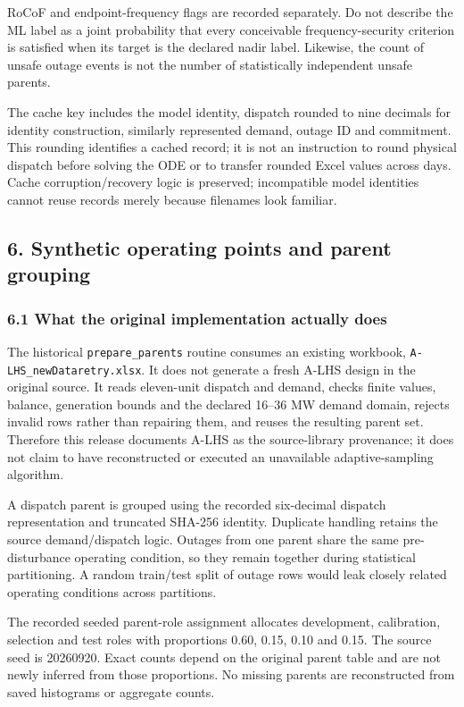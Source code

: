 \documentclass[
  11pt,
  a4paper,
]{article}
\begin{document}
RoCoF and endpoint-frequency flags are recorded separately. Do not
describe the ML label as a joint probability that every conceivable
frequency-security criterion is satisfied when its target is the
declared nadir label. Likewise, the count of unsafe outage events is not
the number of statistically independent unsafe parents.

The cache key includes the model identity, dispatch rounded to nine
decimals for identity construction, similarly represented demand, outage
ID and commitment. This rounding identifies a cached record; it is not
an instruction to round physical dispatch before solving the ODE or to
transfer rounded Excel values across days. Cache corruption/recovery
logic is preserved; incompatible model identities cannot reuse records
merely because filenames look familiar.

\subsection{6. Synthetic operating points and parent
grouping}\label{synthetic-operating-points-and-parent-grouping}

\subsubsection{6.1 What the original implementation actually
does}\label{what-the-original-implementation-actually-does}

The historical \texttt{prepare\_parents} routine consumes an existing
workbook, \texttt{A-LHS\_newDataretry.xlsx}. It does not generate a
fresh A-LHS design in the original source. It reads eleven-unit dispatch
and demand, checks finite values, balance, generation bounds and the
declared 16--36 MW demand domain, rejects invalid rows rather than
repairing them, and reuses the resulting parent set. Therefore this
release documents A-LHS as the source-library provenance; it does not
claim to have reconstructed or executed an unavailable adaptive-sampling
algorithm.

A dispatch parent is grouped using the recorded six-decimal dispatch
representation and truncated SHA-256 identity. Duplicate handling
retains the source demand/dispatch logic. Outages from one parent share
the same pre-disturbance operating condition, so they remain together
during statistical partitioning. A random train/test split of outage
rows would leak closely related operating conditions across partitions.

The recorded seeded parent-role assignment allocates development,
calibration, selection and test roles with proportions 0.60, 0.15, 0.10
and 0.15. The source seed is 20260920. Exact counts depend on the
original parent table and are not newly inferred from those proportions.
No missing parents are reconstructed from saved histograms or aggregate
counts.
\end{document}
